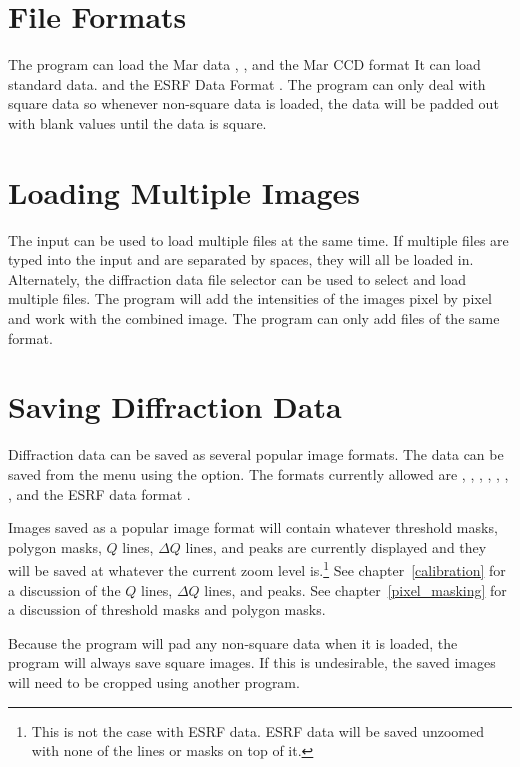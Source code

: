 \section{File Formats}

The program can load the Mar data , 
, and the  Mar CCD format
It can load standard  data. 
and the ESRF Data Format .
The program can only deal with square data so whenever non-square
data is loaded, the data will be padded out with blank values
until the data is square.

\section{Loading Multiple Images}

The  input can be used to load multiple files
at the same time.
If multiple files are typed into the  input and
are separated by spaces, they will all be loaded in. 
Alternately, the diffraction data file 
selector can be used to select and load multiple files.
The program will add the intensities of the images pixel by pixel 
and work with the combined image. The program can only add files 
of the same format.

\section{Saving Diffraction Data}

Diffraction data can be saved as several popular image formats. 
The data can be saved from the  menu using 
the  option. The formats currently allowed are , 
, , , , , , and 
the ESRF data format .

Images saved as a popular image format will contain whatever
threshold masks, polygon masks, $Q$ lines, $\Delta Q$ lines, and peaks 
are currently displayed and they will be saved
at whatever the current zoom level is.\footnote{This is not the case with 
ESRF data. ESRF data will be saved unzoomed with none
of the lines or masks on top of it.} See chapter~\ref{calibration} for 
a discussion of the $Q$ lines, $\Delta Q$ lines, and peaks. See 
chapter~\ref{pixel_masking} for a discussion of threshold masks and 
polygon masks.

Because the program will pad any non-square data when
it is loaded, the program will always save square
images. If this is undesirable, the saved images
will need to be cropped using another program.

